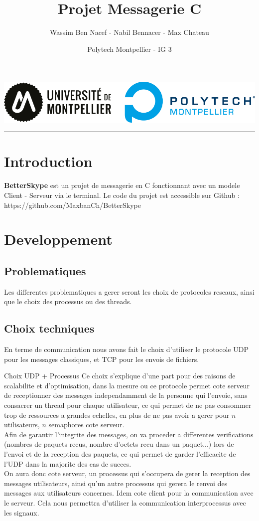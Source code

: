 \documentclass{cs-moi}
\title{Projet Messagerie C}
\author{Wassim Ben Nacef - Nabil Bennacer - Max Chateau}
\date{Polytech Montpellier - IG 3}
\begin{document}
\maketitle{}
\begin{center}
	\includegraphics[width=0.3\linewidth]{logoPolytech.png}
\end{center}

\vspace{4pt}
    \hrule
\vspace{4pt}
  
\section{Introduction}
\textbf{BetterSkype} est un projet de messagerie en C fonctionnant avec un modele Client - Serveur via le terminal. Le code du projet est accessible sur Github :\\https://github.com/MaxbanCh/BetterSkype

\section{Developpement}
\subsection{Problematiques}
Les differentes problematiques a gerer seront les choix de protocoles reseaux, ainsi que le choix des processus ou des threads.

\subsection{Choix techniques}
En terme de communication nous avons fait le choix d'utiliser le protocole UDP pour les messages classiques, et TCP pour les envois de fichiers.

\begin{remarque}{Choix UDP + Processus}
     Ce choix s'explique d'une part pour des raisons de scalabilite et d'optimisation, dans la mesure ou ce protocole permet cote serveur de receptionner des messages independamment de la personne qui l'envoie, sans consacrer un thread pour chaque utilisateur, ce qui permet de ne pas consommer trop de ressources a grandes echelles, en plus de ne pas avoir a gerer pour $n$ utilisateurs, $n$ semaphores cote serveur.\\
     Afin de garantir l'integrite des messages, on va proceder a differentes verifications (nombres de paquets recus, nombre d'octets recu dans un paquet...) lors de l'envoi et de la reception des paquets, ce qui permet de garder l'efficacite de l'UDP dans la majorite des cas de succes.\\
     On aura donc cote serveur, un processus qui s'occupera de gerer la reception des messages utilisateurs, ainsi qu'un autre processus qui gerera le renvoi des messages aux utilisateurs concernes. Idem cote client pour la communication avec le serveur. Cela nous permettra d'utiliser la communication interprocessus avec les signaux.
\end{remarque} 
\end{document}
